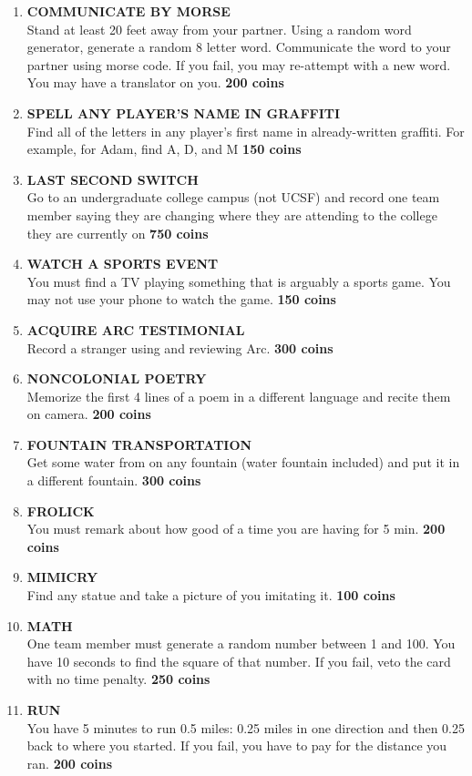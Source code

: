 \documentclass{article}
\begin{document}
\begin{enumerate}
    \item \textbf{COMMUNICATE BY MORSE} \\ Stand at least 20 feet away from your partner. Using a random word generator, generate a random 8 letter word. Communicate the word to your partner using morse code. If you fail, you may re-attempt with a new word. You may have a translator on you. \textbf{200 coins}
    \item \textbf{SPELL ANY PLAYER'S NAME IN GRAFFITI} \\ Find all of the letters in any player's first name in already-written graffiti. For example, for Adam, find A, D, and M \textbf{150 coins}
    \item \textbf{LAST SECOND SWITCH} \\
    Go to an undergraduate college campus (not UCSF) and record one team member saying they are changing where they are attending to the college they are currently on \textbf{750 coins}
    \item \textbf{WATCH A SPORTS EVENT} \\You must find a TV playing something that is arguably a sports game. You may not use your phone to watch the game. \textbf{150 coins}
    \item \textbf{ACQUIRE ARC TESTIMONIAL} \\  Record a stranger using and reviewing Arc. \textbf{300 coins}
    \item \textbf{NONCOLONIAL POETRY} \\ Memorize the first 4 lines of a poem in a different language and recite them on camera. \textbf{200 coins}
    \item \textbf{FOUNTAIN TRANSPORTATION} \\Get some water from on any fountain (water fountain included) and put it in a different fountain. \textbf{300 coins}
    \item \textbf{FROLICK} \\ You must remark about how good of a time you are having for 5 min. \textbf{200 coins}
    \item \textbf{MIMICRY}\\ Find any statue and take a picture of you imitating it. \textbf{100 coins}
    \item \textbf{MATH} \\ One team member must generate a random number between 1 and 100. You have 10 seconds to find the square of that number. If you fail, veto the card with no time penalty. \textbf{250 coins}
    \item \textbf{RUN}\\ You have 5 minutes to run 0.5 miles: 0.25 miles in one direction and then 0.25 back to where you started. If you fail, you have to pay for the distance you ran. \textbf{200 coins}

\end{enumerate}
\end{document}
